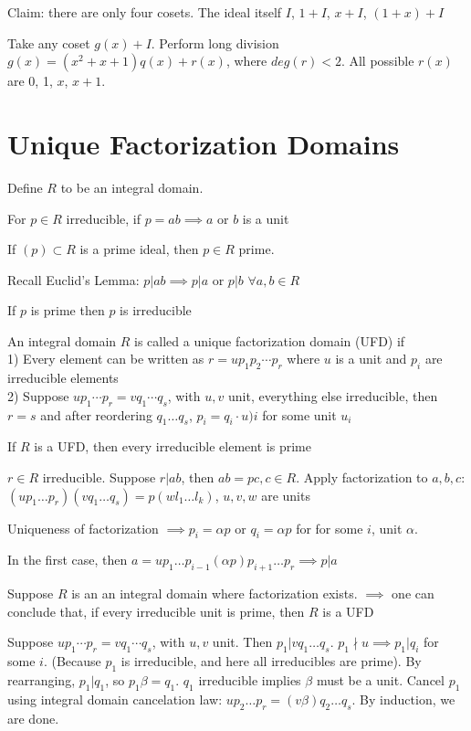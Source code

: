 \documentclass[twoside, 10pt]{article}
\begin{document}
Claim: there are only four cosets. The ideal itself $I$, $1 + I$, $x + I$, $(1 + x) + I$

Take any coset $g(x) + I$. Perform long division $g(x) = (x^2 + x + 1)q(x) + r(x)$, where $deg(r) < 2$. All possible $r(x)$ are 0, 1, $x$, $x + 1$.

\section{Unique Factorization Domains}
Define $R$ to be an integral domain. 
\begin{defn}
    For $p \in R$ irreducible, if $p = ab \implies a$ or $b$ is a unit
\end{defn}

\begin{defn}
    If $(p) \subset R$ is a prime ideal, then $p\in R$ prime.
\end{defn}
Recall Euclid's Lemma: $p | ab \implies p | a$ or $p | b$ $\forall a, b \in R$

\begin{rmk}
    If $p$ is prime then $p$ is irreducible
\end{rmk}

\begin{defn}
    An integral domain $R$ is called a unique factorization domain (UFD) if\\
    1) Every element can be written as $r = up_1p_2\cdots p_r$ where $u$ is a unit and $p_i$ are irreducible elements\\
    2) Suppose $up_1\cdots p_r = vq_1 \cdots q_s$, with $u, v$ unit, everything else irreducible, then $r = s$ and after reordering $q_1\ldots q_s$, $p_i = q_i \cdot u)i$ for some unit $u_i$
\end{defn}

\begin{rmk}
    If $R$ is a UFD, then every irreducible element is prime
\end{rmk}
$r \in R$ irreducible. Suppose $r | ab$, then $ab = pc, c\in R$. Apply factorization to $a, b, c$: $(u p_1\ldots p_r)(vq_1\ldots q_s) = p(wl_1 \ldots l_k)$, $u, v, w$ are units

Uniqueness of factorization $\implies p_i = \alpha p$ or $q_i = \alpha p$ for for some $i$, unit $\alpha$. 

In the first case, then $a = up_1 \ldots p_{i-1}(\alpha p)p_{i + 1}\ldots p_r \implies p | a$

\begin{rmk} %
    Suppose $R$ is an an integral domain where factorization exists. $\implies$ one can conclude that, if every irreducible unit is prime, then $R$ is a UFD
\end{rmk}
Suppose $up_1\cdots p_r = vq_1 \cdots q_s$, with $u, v$ unit. Then $p_1 | vq_1\ldots q_s$. $p_1 \nmid u \implies p_1 | q_i$ for some $i$. (Because $p_1$ is irreducible, and here all irreducibles are prime). By rearranging, $p_1 | q_1$, so $p_1 \beta = q_1$. $q_1$ irreducible implies $\beta$ must be a unit. Cancel $p_1$ using integral domain cancelation law: $up_2\ldots p_r = (v\beta)q_2\ldots q_s$. By induction, we are done.
\end{document}
